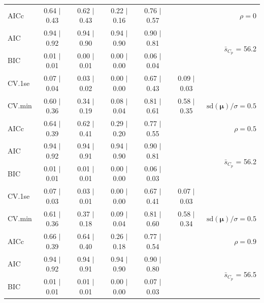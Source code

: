 \documentclass[12pt]{article}
\newcommand{\mr}[1]{\mathrm{#1}}
\newcommand{\bm}[1]{\mathbf{#1}}
\begin{document}
\begin{table}[p]
\begin{center}
\begin{tabular}{l*{5}{c}|r}
AICc & 0.64 $\mid$ 0.43 & 0.62 $\mid$ 0.43 & 0.22 $\mid$ 0.16 & 0.76 $\mid$ 0.57 & & $\rho=0$ \\
AIC & 0.94 $\mid$ 0.92 & 0.94 $\mid$ 0.90 & 0.94 $\mid$ 0.90 & 0.90 $\mid$ 0.81 & & \multirow{2}{*}{$\bar{s}_{C_p}$ = 56.2} \\
BIC & 0.01 $\mid$ 0.01 & 0.00 $\mid$ 0.01 & 0.00 $\mid$ 0.00 & 0.06 $\mid$ 0.04 & & \\
 \hline 
CV.1se & 0.07 $\mid$ 0.04 & 0.03 $\mid$ 0.02 & 0.00 $\mid$ 0.00 & 0.67 $\mid$ 0.43 & 0.09 $\mid$ 0.03 &\\
CV.min & 0.60 $\mid$ 0.36 & 0.34 $\mid$ 0.19 & 0.08 $\mid$ 0.04 & 0.81 $\mid$ 0.61 & 0.58 $\mid$ 0.35 &  $\mr{sd}(\bm{\mu})/\sigma=0.5$ \\
AICc & 0.64 $\mid$ 0.39 & 0.62 $\mid$ 0.41 & 0.29 $\mid$ 0.20 & 0.77 $\mid$ 0.55 & & $\rho=0.5$ \\
AIC & 0.94 $\mid$ 0.92 & 0.94 $\mid$ 0.91 & 0.94 $\mid$ 0.90 & 0.90 $\mid$ 0.81 & & \multirow{2}{*}{$\bar{s}_{C_p}$ = 56.2} \\
BIC & 0.01 $\mid$ 0.01 & 0.01 $\mid$ 0.01 & 0.00 $\mid$ 0.00 & 0.06 $\mid$ 0.03 & & \\
 \hline 
CV.1se & 0.07 $\mid$ 0.03 & 0.03 $\mid$ 0.01 & 0.00 $\mid$ 0.00 & 0.67 $\mid$ 0.41 & 0.07 $\mid$ 0.03 &\\
CV.min & 0.61 $\mid$ 0.36 & 0.37 $\mid$ 0.18 & 0.09 $\mid$ 0.04 & 0.81 $\mid$ 0.60 & 0.58 $\mid$ 0.34 &  $\mr{sd}(\bm{\mu})/\sigma=0.5$ \\
AICc & 0.66 $\mid$ 0.39 & 0.64 $\mid$ 0.40 & 0.26 $\mid$ 0.18 & 0.77 $\mid$ 0.54 & & $\rho=0.9$ \\
AIC & 0.94 $\mid$ 0.92 & 0.94 $\mid$ 0.91 & 0.94 $\mid$ 0.90 & 0.90 $\mid$ 0.80 & & \multirow{2}{*}{$\bar{s}_{C_p}$ = 56.5} \\
BIC & 0.01 $\mid$ 0.01 & 0.01 $\mid$ 0.01 & 0.00 $\mid$ 0.00 & 0.07 $\mid$ 0.03 & & \\
 \hline 
 \end{tabular}
\end{center}
\vspace{-1cm}
\end{table}
\end{document}
